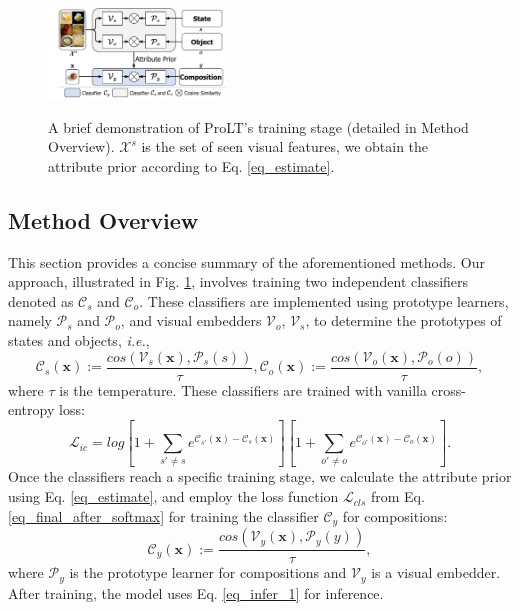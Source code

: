 \documentclass[letterpaper]{article} %
\newcommand{\mx}{\mathbf{x}}
\newcommand{\ie}{\textit{i.e.}}
\theoremstyle{definition}
\begin{document}
	\begin{figure}[t]
		\centering
		\subfigure
		{
			\includegraphics[width=0.42\textwidth]{ fig_method.pdf}
		}
		\caption{A brief demonstration of ProLT's training stage (detailed in Method Overview). $\mathcal{X}^s$ is the set of seen visual features, we obtain the attribute prior according to Eq. \ref{eq_estimate}.}

		\label{fig_method}
	\end{figure}

\subsection{Method Overview}\label{subsec.overview}
This section provides a concise summary of the aforementioned methods. Our approach, illustrated in Fig. \ref{fig_method}, involves training two independent classifiers denoted as $\mathcal{C}_{s}$ and $\mathcal{C}_{o}$. These classifiers are implemented using prototype learners, namely $\mathcal{P}_{s}$ and $\mathcal{P}_{o}$, and visual embedders $\mathcal{V}_{o}$, $\mathcal{V}_{s}$, to determine the prototypes of states and objects, \ie,
\begin{equation}
\mathcal{C}_{s}(\mx):=\frac{cos(\mathcal{V}_{s}(\mx),\mathcal{P}_{s}(s))}{\tau},\mathcal{C}_{o}(\mx):=\frac{cos(\mathcal{V}_{o}(\mx),\mathcal{P}_{o}(o))}{\tau},
        \label{eq_prototype}
	\end{equation}
where $\tau$ is the temperature. These classifiers are trained with vanilla cross-entropy loss:
\begin{equation}
\mathcal{L}_{ic}= log[1+\sum_{s'\neq s}e^{\mathcal{C}_{s'}(\mx)-\mathcal{C}_{s}(\mx)} ][1+\sum_{o'\neq o}e^{\mathcal{C}_{o'}(\mx)-\mathcal{C}_{o}(\mx)} ].
        \label{eq_ce}
	\end{equation}
Once the classifiers reach a specific training stage, we calculate the attribute prior using Eq. \ref{eq_estimate}, and employ the loss function $\mathcal{L}_{cls}$ from Eq. \ref{eq_final_after_softmax} for training the classifier $\mathcal{C}_{y}$ for compositions:
\begin{equation}
\mathcal{C}_{y}(\mx):=\frac{cos(\mathcal{V}_{y}(\mx),\mathcal{P}_{y}(y))}{\tau},
        \label{eq_prototype_common}
	\end{equation}
where $\mathcal{P}_{y}$ is the prototype learner for compositions and $\mathcal{V}_{y}$ is a visual embedder. After training, the model uses Eq. \ref{eq_infer_1} for inference.
\end{document}
